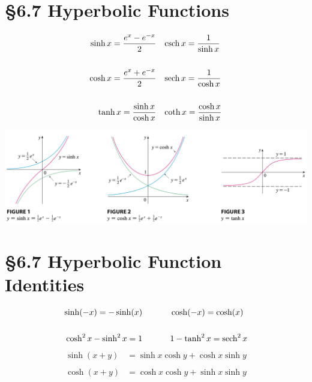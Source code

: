 \section*{\S{6.7} Hyperbolic Functions}
\begin{equation}
\begin{split}
    \sinh x = \frac{e^x - e^{-x}}{2} \;\;\;& \operatorname{csch} x = \frac{1}{\sinh x} \\\\
    \cosh x = \frac{e^x + e^{-x}}{2} \;\;\;& \operatorname{sech} x = \frac{1}{\cosh x} \\\\
    \tanh x = \frac{\sinh x}{\cosh x} \;\;\;& \coth x = \frac{\cosh x}{\sinh x}
\end{split}
\end{equation}
\begin{center}
    \includegraphics[width=1.0\linewidth]{../images/calc-textbook/6.7/2.png}
\end{center}

\section*{\S{6.7} Hyperbolic Function Identities}
\begin{equation}
\begin{split}
    \sinh(-x) = -\sinh(x) \;\;\;\;\;\;\;\;\;\;\;\;& \cosh(-x) = \cosh(x) \\\\
    \cosh^2 x - \sinh^2 x = 1  \;\;\;\;\;\;\;\;\;\;\;\;& 1 - \tanh^2 x = \operatorname{sech}^2 x
\end{split}
\end{equation}
\begin{equation}
\begin{split}
    \sinh(x + y) &= \sinh x \cosh y + \cosh x \sinh y \\\\
    \cosh(x + y) &= \cosh x \cosh y + \sinh x \sinh y
\end{split}
\end{equation}

